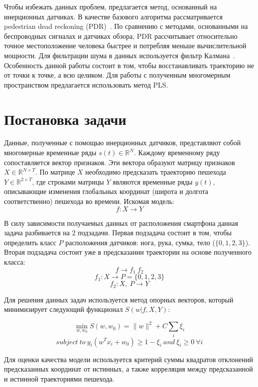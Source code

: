 \documentclass[12pt,twoside]{article}
\begin{document}
Чтобы избежать данных проблем, предлагается метод, основанный на инерционных датчиках. В качестве базового алгоритма рассматривается pedestrian dead reckoning (PDR)~\cite{7743695}. По сравнению с методами, основанными на беспроводных сигналах и датчиках обзора, PDR рассчитывает относительно точное местоположение человека быстрее и потребляя меньше вычислительной мощности. Для фильтрации шума в данных используется фильтр Калмана~\cite{journals/corr/abs-1712-09004}. Особенность данной работы состоит в том, чтобы восстанавливать траекторию не от точки к точке, а всю целиком. Для работы с полученным многомерным пространством предлагается использовать метод PLS\cite{10.1007/11752790_2}.

\section{Постановка задачи}
Данные, полученные с помощью инерционных датчиков, представляют собой многомерные временные ряды $s(t) \in \mathbb{R}^N$. Каждому временному ряду сопоставляется вектор признаков. Эти вектора образуют матрицу признаков $X \in \mathbb{R}^{N \times T}$. По матрице $X$ необходимо предсказать траекторию пешехода $Y \in \mathbb{R}^{2 \times T}$, где строками матрицы $Y$ являются временные ряды $y(t)$, описывающие изменения глобальных координат (широта и долгота соответственно) пешехода во времени. Искомая модель:
\[f: X \to Y\]

В силу зависимости получаемых данных от расположения смартфона данная задача разбивается на 2 подзадачи. Первая подзадача состоит в том, чтобы определить класс $P$ расположения датчиков: нога, рука, сумка, тело ($\{0, 1, 2, 3\}$). Вторая подзадача состоит уже в предсказании траектории на основе полученного класса:
\[f \to f_1 ~ f_2\]
\[f_1: X \to P = \{0, 1, 2, 3\}\]
\[f_2: X, ~P \to Y\]

Для решения данных задач используется метод опорных векторов, который минимизирует следующий функционал $S(w|f, X, Y)$:

\[\min_{w, w_0}S(w, w_0) = \|w\|^2+C\sum_{i}\xi_i\]
\[subject~to~y_i(w^Tx_i+w_0)\geq 1-\xi_i~and~\xi_i \geq 0~\forall i\]

Для оценки качества модели используется критерий суммы квадратов отклонений предсказанных координат от истинных, а также корреляция между предсказанной и истинной траекториями пешехода.
\end{document}
